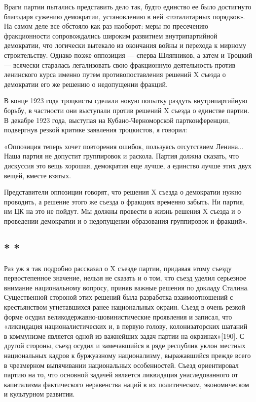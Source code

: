 \documentclass[12pt, a4paper, openany]{book}
\begin{document}
Враги партии пытались представить дело так, будто единство ее было достигнуто благодаря сужению демократии, установлению в ней «тоталитарных порядков». На самом деле все обстояло как раз наоборот: меры по пресечению фракционности сопровождались широким развитием внутрипартийной демократии, что логически вытекало из окончания войны и перехода к мирному строительству. Однако позже оппозиция — сперва Шляпников, а затем и Троцкий — всячески старалась легализовать свою фракционную деятельность против ленинского курса именно путем противопоставления решений X съезда о демократии его же решению о недопущении фракций.

В конце 1923 года троцкисты сделали новую попытку раздуть внутрипартийную борьбу, в частности они выступали против решений X съезда о единстве партии. В декабре 1923 года, выступая на Кубано-Черноморской партконференции, подвергнув резкой критике заявления троцкистов, я говорил:

«Оппозиция теперь хочет повторения ошибок, пользуясь отсутствием Ленина... Наша партия не допустит группировок и раскола. Партия должна сказать, что дискуссия это вещь хорошая, демократия еще лучше, а единство лучше этих двух вещей, вместе взятых.

Представители оппозиции говорят, что решения X съезда о демократии нужно проводить, а решение этого же съезда о фракциях временно забыть. Ни партия, нм ЦК на это не пойдут. Мы должны провести в жизнь решения X съезда и о проведении демократии и о недопущении образования группировок и фракций».

\subsection*{\center * * *}

Раз уж я так подробно рассказал о X съезде партии, придавая этому съезду первостепенное значение, нельзя не сказать и о том, что съезд уделил серьезное внимание национальному вопросу, приняв важные решения по докладу Сталина. Существенной стороной этих решений была разработка взаимоотношений с крестьянством угнетавшихся ранее национальных окраин. Съезд в очень резкой форме осудил великодержавно-шовинистические проявления и записал, что «ликвидация националистических и, в первую голову, колонизаторских шатаний в коммунизме является одной из важнейших задач партии на окраинах»[190]. С другой стороны, съезд осудил и замечавшийся в ряде республик уклон местных национальных кадров к буржуазному национализму, выражавшийся прежде всего в чрезмерном выпячивании национальных особенностей. Съезд ориентировал партию на то, что основной задачей является ликвидация унаследованного от капитализма фактического неравенства наций в их политическом, экономическом и культурном развитии.
\end{document}
